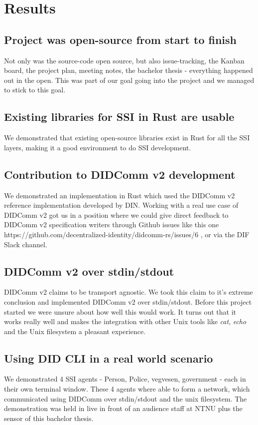 \hypertarget{results}{%
\chapter{Results}\label{results}}


\section{Project was open-source from start to finish}

Not only was the source-code open source, but also issue-tracking, the Kanban board, the project plan, meeting notes, the bachelor thesis - everything happened out in the open. This was part of our goal going into the project and we managed to stick to this goal.


\section{Existing libraries for SSI in Rust are usable}

We demonstrated that existing open-source libraries exist in Rust for all the SSI layers, making it a good environment to do SSI development.


\section{Contribution to DIDComm v2 development}

We demonstrated an implementation in Rust which used the DIDComm v2 reference implementation developed by DIN. Working with a real use case of DIDComm v2 got us in a position where we could give direct feedback to DIDComm v2 specification writers through Github issues like this one https://github.com/decentralized-identity/didcomm-rs/issues/6 , or via the DIF Slack channel.


\section{DIDComm v2 over stdin/stdout}

DIDComm v2 claims to be transport agnostic. We took this claim to it's extreme conclusion and implemented DIDComm v2 over stdin/stdout. Before this project started we were unsure about how well this would work. It turns out that it works really well and makes the integration with other Unix tools like \textit{cat}, \textit{echo} and the Unix filesystem  a pleasant experience.



\section{Using DID CLI in a real world scenario}

We demonstrated 4 SSI agents - Person, Police, vegvesen, government - each in their own terminal window. These 4 agents where able to form a network, which communicated using DIDComm over stdin/stdout and the unix filesystem. The demonstration was held in live in front of an audience staff at NTNU plus the sensor of this bachelor thesis.
